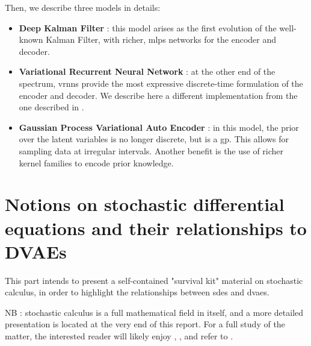 \documentclass[twoside,11pt]{report}
\begin{document}
Then, we describe three models in details:
\begin{itemize}
    \item \textbf{Deep Kalman Filter} : this model arises as the first evolution of the well-known Kalman Filter, with richer, \glspl{mlp} networks for the encoder and decoder.
    \item \textbf{Variational Recurrent Neural Network} : at the other end of the spectrum, \glspl{vrnn} provide the most expressive discrete-time formulation of the encoder and decoder.
We describe here a different implementation from the one described in \cite{girin_dynamical_2022}.
    \item \textbf{Gaussian Process Variational Auto Encoder} : in this model, the prior over the latent variables is no longer discrete, but is a \gls{gp}.
This allows for sampling data at irregular intervals. Another benefit is the use of richer kernel families to encode prior knowledge.
\end{itemize}

    
    
    
    
    

% 
%
%
%

\part{Notions on stochastic differential equations and their relationships to DVAEs}

This part intends to present a self-contained "survival kit" material on stochastic calculus, in order to highlight the relationships between \glspl{sde} and \glspl{dvae}.

NB : stochastic calculus is a full mathematical field in itself, and a more detailed presentation is located at the very end of this report. For a full study
of the matter, the interested reader will likely enjoy \cite{mouvement-brownien-calcul-ito}, \cite{sarkka_applied_2019}, and refer to \cite{cours-jf-legall}.

    
    
    
    
\end{document}
